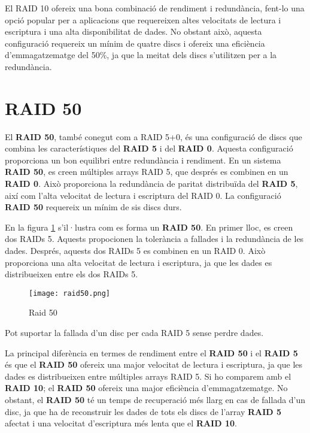 \begin{info}
El RAID 10 ofereix una bona combinació de rendiment i redundància, fent-lo una opció popular per a aplicacions que requereixen altes velocitats de lectura i escriptura i una alta disponibilitat de dades. No obstant això, aquesta configuració requereix un mínim de quatre discs i ofereix una eficiència d'emmagatzematge del 50\%, ja que la meitat dels discs s'utilitzen per a la redundància.
\end{info}
        

\section{RAID 50}\label{raid-50}

El \textbf{RAID 50}, també conegut com a RAID 5+0, és una configuració de discs que combina les característiques del \textbf{RAID 5} i del \textbf{RAID 0}. Aquesta configuració proporciona un bon equilibri entre redundància i rendiment. En un sistema \textbf{RAID 50}, es creen múltiples arrays RAID 5, que després es combinen en un \textbf{RAID 0}. Això proporciona la redundància de paritat distribuïda del \textbf{RAID 5}, així com l'alta velocitat de lectura i escriptura del RAID 0. La configuració \textbf{RAID 50} requereix un mínim de sis discs durs. 

En la figura \ref{fig:raid50} s'il·lustra com es forma un \textbf{RAID 50}. En primer lloc, es creen dos RAIDs 5. Aquests propocionen la tolerància a fallades i la redundància de les dades. Després, aquests dos RAIDs 5 es combinen en un RAID 0. Això proporciona una alta velocitat de lectura i escriptura, ja que les dades es distribueixen entre els dos RAIDs 5.


\begin{figure}[!htb]
\centering
\texttt{[image: raid50.png]}
\caption{Raid 50}
\label{fig:raid50}
\end{figure}

\begin{info}
Pot suportar la fallada d'un disc per cada RAID 5 sense perdre dades.
\end{info}

La principal diferència en termes de rendiment entre el \textbf{RAID 50} i el \textbf{RAID 5} és que el \textbf{RAID 50} ofereix una major velocitat de lectura i escriptura, ja que les dades es distribueixen entre múltiples arrays RAID 5. Si ho comparem amb el \textbf{RAID 10}; el \textbf{RAID 50} ofereix una major eficiència d'emmagatzematge. No obstant, el \textbf{RAID 50} té un temps de recuperació més llarg en cas de fallada d'un disc, ja que ha de reconstruir les dades de tots els discs de l'array \textbf{RAID 5} afectat i una velocitat d'escriptura més lenta que el \textbf{RAID 10}.


